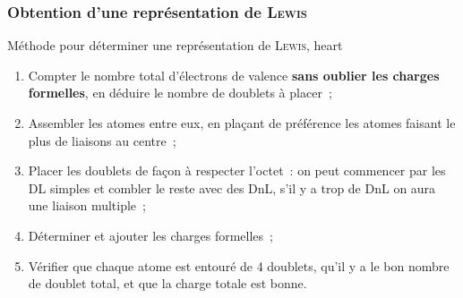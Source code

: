 \documentclass[../main/main.tex]{subfiles}
\begin{document}
\vspace{-15pt}
\subsubsection{Obtention d'une représentation de \textsc{Lewis}}
\begin{tror}{Méthode pour déterminer une représentation de \textsc{Lewis},
    heart}
    \begin{enumerate}[label=\sqenumi]
        \item Compter le nombre total d'électrons de valence \textbf{sans oublier
            les charges formelles}, en déduire le nombre
            de doublets à placer~;
        \item Assembler les atomes entre eux, en plaçant de préférence les atomes
            faisant le plus de liaisons au centre~;
        \item Placer les doublets de façon à respecter l'octet~: on peut commencer
            par les DL simples et combler le reste avec des DnL, s'il y a trop de
            DnL on aura une liaison multiple~;
        \item Déterminer et ajouter les charges formelles~;
        \item Vérifier que chaque atome est entouré de 4 doublets, qu'il y a le bon
            nombre de doublet total, et que la charge totale est bonne.
    \end{enumerate}
\end{tror}
\end{document}
